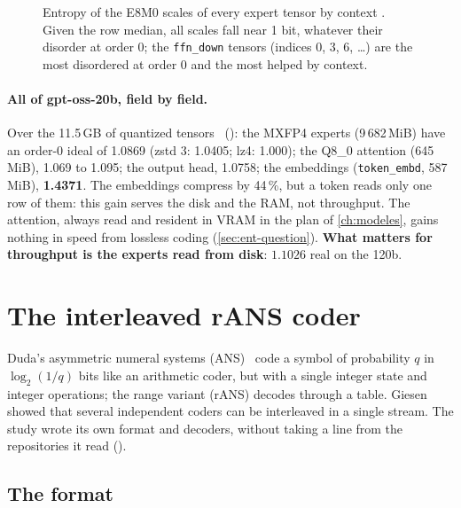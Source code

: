 \begin{figure}[ht]
\centering
\GrapheEchelles
\caption[Entropy of the E8M0 scales, tensor by tensor]{Entropy of the E8M0 scales of every expert tensor by context \mes. Given the row median, all scales fall near 1 bit, whatever their disorder at order 0; the \texttt{ffn\_down} tensors (indices 0, 3, 6, \ldots) are the most disordered at order 0 and the most helped by context.}
\label{fig:ent-echelles}
\end{figure}

\paragraph{All of gpt-oss-20b, field by field.} Over the 11.5\,GB of quantized tensors \mes~(): the MXFP4 experts (9\,682\,MiB) have an order-0 ideal of 1.0869 (zstd 3: 1.0405; lz4: 1.000); the Q8\_0 attention (645\,MiB), 1.069 to 1.095; the output head, 1.0758; the embeddings (\texttt{token\_embd}, 587\,MiB), \textbf{1.4371}. The embeddings compress by 44\,\%, but a token reads only one row of them: this gain serves the disk and the RAM, not throughput. The attention, always read and resident in VRAM in the plan of \cref{ch:modeles}, gains nothing in speed from lossless coding (\cref{sec:ent-question}). \textbf{What matters for throughput is the experts read from disk}: $1.1026$ real on the 120b.

\section{The interleaved rANS coder}\label{sec:ent-rans}

Duda's asymmetric numeral systems (ANS)~\cite{duda2013ans} code a symbol of probability $q$ in $\log_2(1/q)$ bits like an arithmetic coder, but with a single integer state and integer operations; the range variant (rANS) decodes through a table. Giesen~\cite{giesen2014interleaved} showed that several independent coders can be interleaved in a single stream. The study wrote its own format and decoders, without taking a line from the repositories it read ().

\subsection{The format}

